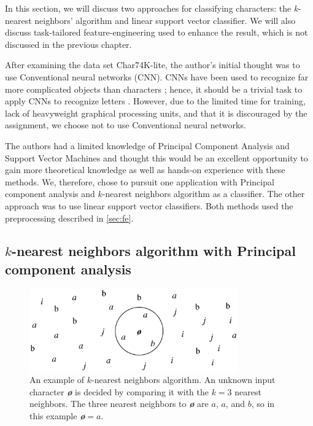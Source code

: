 \documentclass[../main.tex]{subfiles}
\begin{document}
In this section, we will discuss two approaches for classifying characters: the $k$-nearest neighbors' algorithm and linear support vector classifier. We will also discuss task-tailored feature-engineering used to enhance the result, which is not discussed in the previous chapter. 

After examining the data set Char74K-lite, the author's initial thought was to use Conventional neural networks (CNN). CNNs have been used to recognize far more complicated objects than characters \cite{cnn_1}; hence, it should be a trivial task to apply CNNs to recognize letters \cite{cnn_2}. However, due to the limited time for training, lack of heavyweight graphical processing units, and that it is discouraged by the assignment, we choose not to use Conventional neural networks. 

The authors had a limited knowledge of Principal Component Analysis and Support Vector Machines and thought this would be an excellent opportunity to gain more theoretical knowledge as well as hands-on experience with these methods. We, therefore, chose to pursuit one application with Principal component analysis and $k$-nearest neighbors algorithm as a classifier. The other approach was to use linear support vector classifiers. Both methods used the preprocessing described in \autoref{sec:fe}.

\subsection{$k$-nearest neighbors algorithm with Principal component analysis}

\begin{figure}
  \centering
  \includegraphics[width=0.8\textwidth]{figures/knn-ex}
  \caption{An example of $k$-nearest neighbors algorithm. An unknown input character \textit{\textbf{\o}} is decided by comparing it with the $k=3$ nearest neighbors. The three nearest neighbors to \textit{\textbf{\o}} are $a$, $a$, and $b$, so in this example \textit{\textbf{\o}}$=a$.} 
  \label{fig:knn}
\end{figure}
\end{document}
